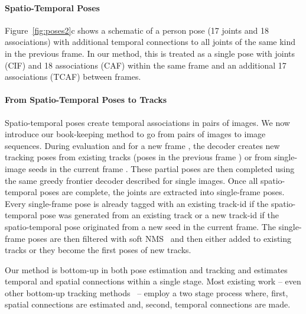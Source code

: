 \documentclass[journal]{IEEEtran}
\begin{document}
\paragraph{Spatio-Temporal Poses}
\label{sec:st-pose}

Figure~\ref{fig:poses2}c shows a schematic of a person pose
(17 joints and 18 associations) with additional temporal
connections to all joints of the same kind in the previous frame.
In our method, this is treated as a single pose with  joints (CIF)
and 18 associations (CAF) within the same frame and an
additional 17 associations (TCAF) between frames.



\paragraph{From Spatio-Temporal Poses to Tracks}

Spatio-temporal poses create temporal associations in pairs of images. We now
introduce our book-keeping method to go from pairs of images to image sequences.
During evaluation and for a new frame , the decoder creates new tracking
poses from existing tracks (poses in the previous frame ) or from
single-image seeds in the current frame .
These partial poses are then completed using the same greedy frontier decoder
described for single images.
Once all spatio-temporal poses are complete, the  joints are extracted
into single-frame poses. Every single-frame pose is already tagged with an
existing track-id if the spatio-temporal pose was generated from an existing track
or a new track-id if the spatio-temporal pose originated from a new seed in the current frame.
The single-frame poses are
then filtered with soft NMS~\cite{papandreou2018personlab} and then either
added to existing tracks or they become the first poses of new tracks.


Our method is bottom-up in both pose estimation and
tracking and estimates temporal and spatial connections within a
single stage. Most existing work -- even other bottom-up
tracking methods~\cite{doering2018joint,hwang2019pose} -- employ a two
stage process where, first, spatial connections
are estimated and, second, temporal connections are made.
\end{document}
